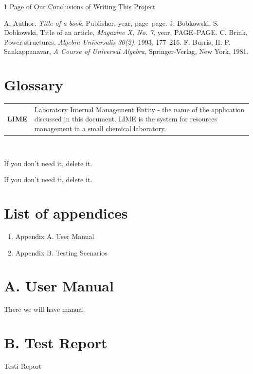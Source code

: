 \documentclass[a4paper,11pt,twoside]{report}
\theoremstyle{definition}
\begin{document}
1 Page of Our Conclusions of Writing This Project
\thispagestyle{empty}






\begin{thebibliography}{20} %

 A. Author, \emph{Title of a book}, Publisher, year, page--page.
 J. Bobkowski, S. Dobkowski, Title of an article, \emph{Magazine X, No. 7}, year, PAGE--PAGE.
 C. Brink, Power structures, \emph{Algebra Universalis 30(2)}, 1993, 177--216.
 F. Burris, H. P. Sankappanavar, \emph{A Course of Universal Algebra}, Springer-Verlag, New York, 1981.
\end{thebibliography}
\thispagestyle{empty}



\chapter*{Glossary}
\begin{tabular}{cl}

\textbf{LIME} & Laboratory Internal Management Entity - the name of the application discussed in this document. LIME is the system for resources management in a small chemical laboratory. \\

\end{tabular}
\\

\thispagestyle{empty}


\listoffigures
\thispagestyle{empty}
If you don't need it, delete it.


\renewcommand{\listtablename}{List of tables}
\listoftables
\thispagestyle{empty}
If you don't need it, delete it.

\chapter*{List of appendices}
\begin{enumerate}
\item Appendix A. User Manual
\item Appendix B. Testing Scenarios
\end{enumerate}
\thispagestyle{empty}


\chapter*{A. User Manual}

There we will have manual
\thispagestyle{empty}

\chapter*{B. Test Report}

Testi Report
\thispagestyle{empty}
\end{document}

